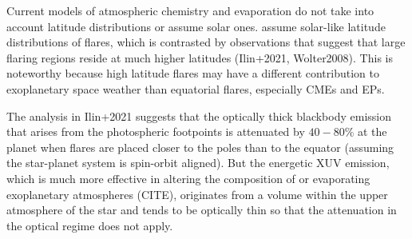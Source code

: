 \documentclass[proof]{WileyASNA-v1}
\begin{document}
Current models of atmospheric chemistry and evaporation do not take into account latitude distributions or assume solar ones. \citet{tilley2019} assume solar-like latitude distributions of flares, which is contrasted by observations that suggest that large flaring regions reside at much higher latitudes (Ilin+2021, Wolter2008).
This is noteworthy because high latitude flares may have a different contribution to exoplanetary space weather than equatorial flares, especially CMEs and EPs.

The analysis in Ilin+2021 suggests that the optically thick blackbody emission that arises from the photospheric footpoints is attenuated by $40-80\%$ at the planet when flares are placed closer to the poles than to the equator (assuming the star-planet system is spin-orbit aligned). But the energetic XUV emission, which is much more effective in altering the composition of or evaporating exoplanetary atmospheres (CITE), originates from a volume within the upper atmosphere of the star and tends to be optically thin so that the attenuation in the optical regime does not apply.
\end{document}
